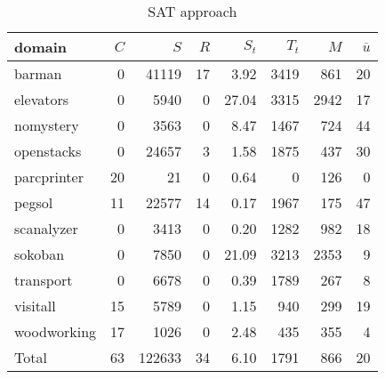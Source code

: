 \begin{table}[htbp]
\centering
\begingroup\small
\begin{tabular}{lrrrrrrr}
  \hline
domain & $C$ & $S$ & $R$ & $S_t$ & $T_t$ & $M$ & $\overline{u}$ \\ 
  \hline
barman &   0 & 41119 &  17 & 3.92 & 3419 & 861 &  20 \\ 
  elevators &   0 & 5940 &   0 & 27.04 & 3315 & 2942 &  17 \\ 
  nomystery &   0 & 3563 &   0 & 8.47 & 1467 & 724 &  44 \\ 
  openstacks &   0 & 24657 &   3 & 1.58 & 1875 & 437 &  30 \\ 
  parcprinter &  20 &  21 &   0 & 0.64 &   0 & 126 &   0 \\ 
  pegsol &  11 & 22577 &  14 & 0.17 & 1967 & 175 &  47 \\ 
  scanalyzer &   0 & 3413 &   0 & 0.20 & 1282 & 982 &  18 \\ 
  sokoban &   0 & 7850 &   0 & 21.09 & 3213 & 2353 &   9 \\ 
  transport &   0 & 6678 &   0 & 0.39 & 1789 & 267 &   8 \\ 
  visitall &  15 & 5789 &   0 & 1.15 & 940 & 299 &  19 \\ 
  woodworking &  17 & 1026 &   0 & 2.48 & 435 & 355 &   4 \\ 
  Total &  63 & 122633 &  34 & 6.10 & 1791 & 866 &  20 \\ 
   \hline
\end{tabular}
\endgroup
\caption{SAT approach} 
\label{tab:sat}
\end{table}
